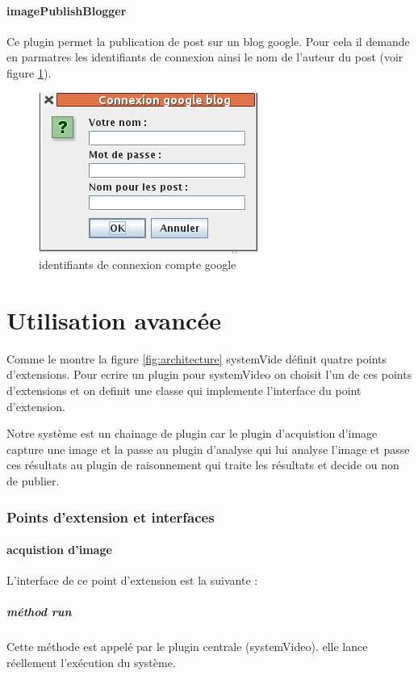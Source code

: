 \documentclass[a4paper , 12pt]{article}
\begin{document}
\subsection{imagePublishBlogger}
Ce plugin permet la publication de post sur un blog google. Pour cela il demande en parmatres les identifiants de connexion ainsi le nom de l'auteur du post (voir figure \ref{fig:google}).

\begin{figure}
  \includegraphics[scale=0.45]{images/google.png}
  \caption{identifiants de connexion compte google}
  \label{fig:google}
\end{figure}

\part*{Utilisation avancée}
Comme le montre la figure \ref{fig:architecture} systemVide définit quatre points d'extensions. Pour ecrire un plugin pour systemVideo on choisit l'un de ces points d'extensions et on definit une classe qui implemente l'interface du point d'extension.

Notre système est un chainage de plugin car le plugin d'acquistion d'image capture une image et la passe au plugin d'analyse qui lui analyse l'image et passe ces résultats au plugin de raisonnement qui traite les résultats et decide ou non de publier.

  \section{Points d'extension et interfaces} 
  \subsection{acquistion d'image}
  L'interface de ce point d'extension est la suivante :
  
  \subsubsection*{méthod run}
  Cette méthode est appelé par le plugin centrale (systemVideo). elle lance réellement l'exécution du système.
\end{document}
